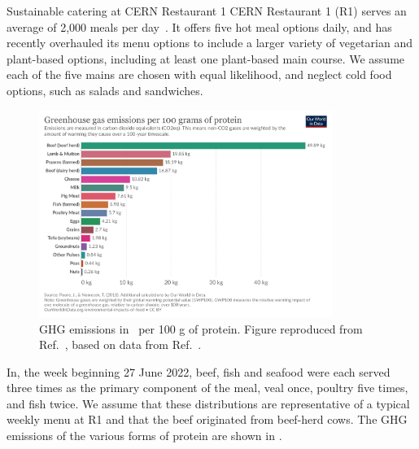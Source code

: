 \documentclass[../SustainableHEP.tex]{subfiles}
\begin{document}
\begin{casestudy}{Sustainable catering at CERN Restaurant 1}%
    CERN Restaurant 1 (R1) serves an average of 2,000 meals per day~\cite{CERNACCUMeeting}. It offers five hot meal options daily, and has recently overhauled its menu options to include a larger variety of vegetarian and plant-based options, including at least one plant-based main course.  We assume each of the five mains are chosen with equal likelihood, and neglect cold food options, such as salads and sandwiches.

    \begin{figure}
        \captionsetup{type=figure}
        \includegraphics[width=0.85\textwidth]{Sections/Figs/Food/Emissions-protein.png}
        \caption[GHG emissions per 100 g of protein]{GHG emissions in \CdOe\ per 100 g of protein. Figure reproduced from Ref.~\cite{OWID-Food}, based on data from Ref.~\cite{PooreNemecek2018}.}
        \label{fig:ghg-per-protein}
    \end{figure}

    In, \eg the week beginning 27 June 2022, beef, fish and seafood were each served three times as the primary component of the meal, veal once, poultry five times, and fish twice.  We assume that these distributions are representative of a typical weekly menu at R1 and that the beef originated from beef-herd cows. The GHG emissions of the various forms of protein are shown in .


\end{casestudy}
\end{document}
